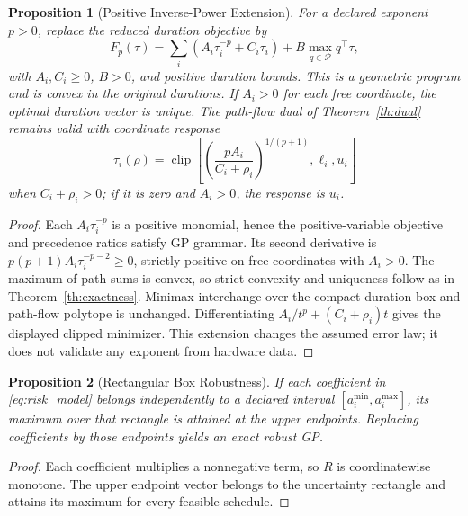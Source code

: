 \documentclass[10pt,letterpaper,journal]{IEEEtran}
\newtheorem{proposition}{Proposition}
\begin{document}
\begin{proposition}[Positive Inverse-Power Extension]\label{prop:power}
For a declared exponent $p>0$, replace the reduced duration objective by
\begin{equation}
F_p(\tau)=\sum_i\left(A_i\tau_i^{-p}+C_i\tau_i\right)+B\max_{q\in\mathcal P}q^\top\tau,
\end{equation}
with $A_i,C_i\ge0$, $B>0$, and positive duration bounds. This is a geometric program and is convex in the original durations. If $A_i>0$ for each free coordinate, the optimal duration vector is unique. The path-flow dual of Theorem~\ref{th:dual} remains valid with coordinate response
\begin{equation}
\tau_i(\rho)=\operatorname{clip}\!\left[\left(\frac{pA_i}{C_i+\rho_i}\right)^{1/(p+1)},\ell_i,u_i\right]
\end{equation}
when $C_i+\rho_i>0$; if it is zero and $A_i>0$, the response is $u_i$.
\end{proposition}
\begin{proof}
Each $A_i\tau_i^{-p}$ is a positive monomial, hence the positive-variable objective and precedence ratios satisfy GP grammar. Its second derivative is $p(p+1)A_i\tau_i^{-p-2}\ge0$, strictly positive on free coordinates with $A_i>0$. The maximum of path sums is convex, so strict convexity and uniqueness follow as in Theorem~\ref{th:exactness}. Minimax interchange over the compact duration box and path-flow polytope is unchanged. Differentiating $A_i/t^p+(C_i+\rho_i)t$ gives the displayed clipped minimizer. This extension changes the assumed error law; it does not validate any exponent from hardware data.
\end{proof}

\begin{proposition}[Rectangular Box Robustness]
If each coefficient in \eqref{eq:risk_model} belongs independently to a declared interval $[a_i^{\min}, a_i^{\max}]$, its maximum over that rectangle is attained at the upper endpoints. Replacing coefficients by those endpoints yields an exact robust GP.
\end{proposition}
\begin{proof}
Each coefficient multiplies a nonnegative term, so $R$ is coordinatewise monotone. The upper endpoint vector belongs to the uncertainty rectangle and attains its maximum for every feasible schedule.
\end{proof}
\end{document}
